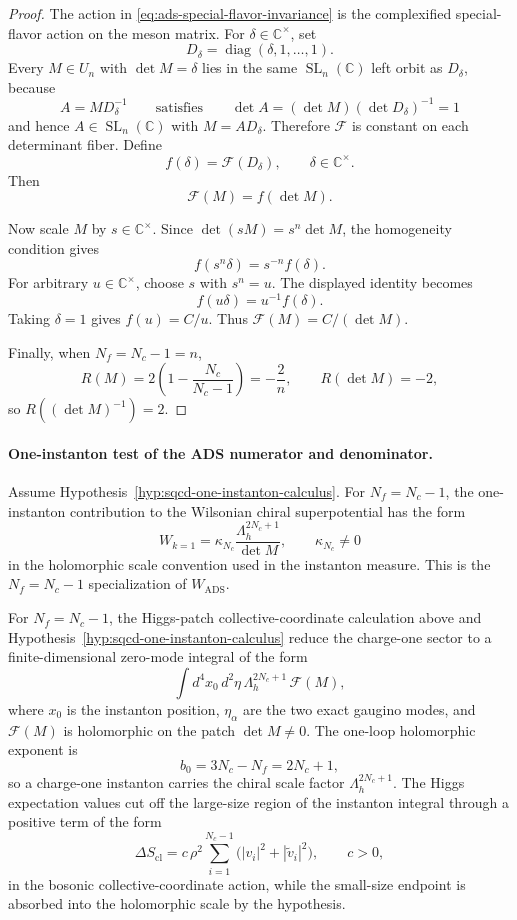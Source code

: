 \begin{proof}
The action in \eqref{eq:ads-special-flavor-invariance} is the complexified
special-flavor action on the meson matrix.  For
\(\delta\in\mathbb C^\times\), set
\[
  D_\delta=\operatorname{diag}(\delta,1,\ldots,1).
\]
Every \(M\in U_n\) with \(\det M=\delta\) lies in the same
\(\operatorname{SL}_n(\mathbb C)\) left orbit as \(D_\delta\), because
\[
  A=M D_\delta^{-1}
  \qquad\text{satisfies}\qquad
  \det A=(\det M)(\det D_\delta)^{-1}=1
\]
and hence \(A\in \operatorname{SL}_n(\mathbb C)\) with \(M=AD_\delta\).
Therefore
\(\mathcal F\) is constant on each determinant fiber.  Define
\[
  f(\delta)=\mathcal F(D_\delta),\qquad \delta\in\mathbb C^\times .
\]
Then
\[
  \mathcal F(M)=f(\det M).
\]

Now scale \(M\) by \(s\in\mathbb C^\times\).  Since
\(\det(sM)=s^n\det M\), the homogeneity condition gives
\[
  f(s^n\delta)=s^{-n}f(\delta).
\]
For arbitrary \(u\in\mathbb C^\times\), choose \(s\) with \(s^n=u\).  The
displayed identity becomes
\[
  f(u\delta)=u^{-1}f(\delta).
\]
Taking \(\delta=1\) gives \(f(u)=C/u\).  Thus
\(\mathcal F(M)=C/(\det M)\).

Finally, when \(N_f=N_c-1=n\),
\[
  R(M)=2\left(1-\frac{N_c}{N_c-1}\right)=-\frac{2}{n},
  \qquad
  R(\det M)=-2,
\]
so \(R((\det M)^{-1})=2\).
\end{proof}

\paragraph{One-instanton test of the ADS numerator and denominator.}
\label{par:ads-one-instanton-test}
Assume Hypothesis~\ref{hyp:sqcd-one-instanton-calculus}.  For
\(N_f=N_c-1\), the one-instanton contribution to the Wilsonian chiral
superpotential has the form
\[
  W_{k=1}
  =
  \kappa_{N_c}
  \frac{\Lambda_h^{2N_c+1}}{\det M},
  \qquad
  \kappa_{N_c}\neq0
\]
in the holomorphic scale convention used in the instanton measure.  This is
the \(N_f=N_c-1\) specialization of \(W_{\mathrm{ADS}}\).

For \(N_f=N_c-1\), the Higgs-patch collective-coordinate calculation above and
Hypothesis~\ref{hyp:sqcd-one-instanton-calculus} reduce the charge-one sector
to a finite-dimensional zero-mode integral of the form
\begin{equation}
  \int d^4x_0\,d^2\eta\,
  \Lambda_h^{2N_c+1}\,\mathcal F(M),
  \label{eq:ads-reduced-instanton-integral}
\end{equation}
where \(x_0\) is the instanton position, \(\eta_\alpha\) are the two exact
gaugino modes, and \(\mathcal F(M)\) is holomorphic on the patch
\(\det M\neq0\).  The one-loop holomorphic exponent is
\[
  b_0=3N_c-N_f=2N_c+1,
\]
so a charge-one instanton carries the chiral scale factor
\(\Lambda_h^{2N_c+1}\).  The Higgs expectation values cut off the large-size
region of the instanton integral through a positive term of the form
\[
  \Delta S_{\mathrm{cl}}
  =
  c\,\rho^2
  \sum_{i=1}^{N_c-1}\bigl(|v_i|^2+|\widetilde v_i|^2\bigr),
  \qquad c>0,
\]
in the bosonic collective-coordinate action, while the small-size endpoint is
absorbed into the holomorphic scale by the hypothesis.

